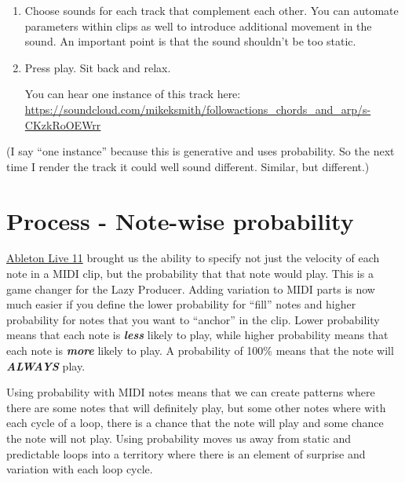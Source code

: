 \documentclass[
  12pt,
  letterpaper,
  oneside,
  open=any]{scrbook}
\begin{document}
\begin{enumerate}
\def\labelenumi{\arabic{enumi}.}
\setcounter{enumi}{7}
\item
  Choose sounds for each track that complement each other. You can
  automate parameters within clips as well to introduce additional
  movement in the sound. An important point is that the sound shouldn't
  be too static.
\item
  Press play. Sit back and relax.

  You can hear one instance of this track here:
  \href{https://soundcloud.com/mikeksmith/followactions_chords_and_arp/s-CKzkRoOEWrr?in=mikeksmith/sets/the-lazy-producer-recipes/s-PGMEWqfwKGz&si=e1846c9235ff47ad9ae0fa0cd5d52708&utm_source=clipboard&utm_medium=text&utm_campaign=social_sharing}{https://soundcloud.com/mikeksmith/followactions\_chords\_and\_arp/s-CKzkRoOEWrr}
\end{enumerate}

(I say ``one instance'' because this is generative and uses probability.
So the next time I render the track it could well sound different.
Similar, but different.)


\chapter{Process - Note-wise
probability}\label{Chapter-002-Process-Note_wise_probability}

\href{https://www.ableton.com/en/live-manual/11/welcome-to-live/\#welcome-to-live}{Ableton
Live 11} brought us the ability to specify not just the velocity of each
note in a MIDI clip, but the probability that that note would play. This
is a game changer for the Lazy Producer. Adding variation to MIDI parts
is now much easier if you define the lower probability for ``fill''
notes and higher probability for notes that you want to ``anchor'' in
the clip. Lower probability means that each note is \textbf{\emph{less}}
likely to play, while higher probability means that each note is
\textbf{\emph{more}} likely to play. A probability of 100\% means that
the note will \textbf{\emph{ALWAYS}} play.

\begin{tcolorbox}[enhanced jigsaw, arc=.35mm, title=\textcolor{quarto-callout-tip-color}{\faLightbulb}\hspace{0.5em}{Key idea}, colback=white, opacitybacktitle=0.6, coltitle=black, toptitle=1mm, colframe=quarto-callout-tip-color-frame, bottomtitle=1mm, titlerule=0mm, rightrule=.15mm, bottomrule=.15mm, colbacktitle=quarto-callout-tip-color!10!white, toprule=.15mm, breakable, opacityback=0, left=2mm, leftrule=.75mm]

Using probability with MIDI notes means that we can create patterns
where there are some notes that will definitely play, but some other
notes where with each cycle of a loop, there is a chance that the note
will play and some chance the note will not play. Using probability
moves us away from static and predictable loops into a territory where
there is an element of surprise and variation with each loop cycle.

\end{tcolorbox}
\end{document}
